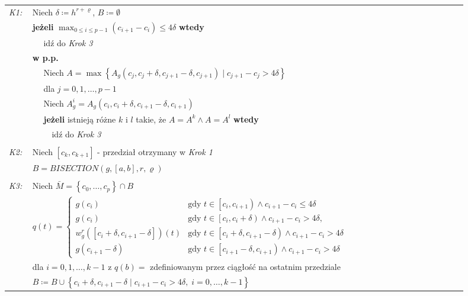 \documentclass[oik, pdftex, robocza, man]{mgrwms}
\begin{document}
\vspace{10pt}
\begin{tabular}{p{0.045\linewidth} p{0.85\linewidth}}
    \textit{K1:}    & Niech $\delta \coloneqq h^{r+\varrho}$, $B \coloneqq \emptyset$ \\
                    & \textbf{jeżeli} \(\displaystyle \max_{0 \leq i \leq p-1} (c_{i+1} - c_{i}) \leq 4\delta \) \textbf{wtedy} \\
                    & $\quad$ idź do \textit{Krok 3} \\
                    & \textbf{w p.p.} \\
                    & $\quad$ Niech $A=\max \left\{A_{g}\left(c_{j}, c_{j}+\delta, c_{j+1}-\delta, c_{j+1}\right) \mid c_{j+1}-c_{j}>4 \delta\right\}$ \\
                    & $\quad$ dla $j=0,1, \ldots, p-1$ \\
                    & $\quad$ Niech $A_{g}^{i} = A_{g}\left(c_{i}, c_{i}+\delta, c_{i+1}-\delta, c_{i+1}\right)$ \\
                    & $\quad$ \textbf{jeżeli} istnieją różne $k$ i $l$ takie, że $A = A^{k} \land A = A^{l}$ \textbf{wtedy} \\
                    & $\quad\quad$ idź do \textit{Krok 3} \\
                    & \\

    \textit{K2:}    & Niech $[c_{k}, c_{k+1}]$ - przedział otrzymany w \textit{Krok 1}\\
                    & $B = BISECTION(g, [a,b], r, \varrho)$\\
                    & \\

    \textit{K3:}    & Niech $\bar{M} = \left\{ c_{0}, \dots, c_{p} \right\} \cap B$ \\
                    & $q(t)= \begin{cases}
                        g\left(c_{i}\right)                                                 &\text{gdy } t \in \left[c_{i}, c_{i+1}\right) \land c_{i+1}-c_{i} \leq 4 \delta \\ 
                        g\left(c_{i}\right)                                                 &\text{gdy } t \in \left[c_{i}, c_{i}+\delta\right) \land c_{i+1}-c_{i}>4 \delta, \\ 
                        w_{g}^{r}\left(\left[c_{i}+\delta, c_{i+1}-\delta\right]\right)(t)  &\text{gdy } t \in\left[c_{i}+\delta, c_{i+1}-\delta\right) \land c_{i+1}-c_{i}>4 \delta \\ 
                        g\left(c_{i+1}-\delta\right)                                        &\text{gdy } t \in\left[c_{i+1}-\delta, c_{i+1}\right) \land c_{i+1}-c_{i}>4 \delta
                        \end{cases}$ \\
                    & dla $i=0,1,\dots,k-1$ z $q(b) = $ zdefiniowanym przez ciągłość na ostatnim przedziale \\
                    & $B \coloneqq B \cup \left\{ c_{i} + \delta, c_{i+1} - \delta \mid c_{i+1} - c_{i} > 4\delta,\; i=0,\dots,k-1 \right\}$ \\


\end{tabular}
\end{document}
